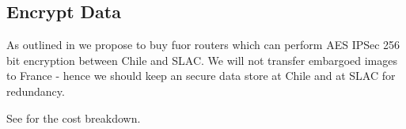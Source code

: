 \subsection{Encrypt Data} \label{sec:1encrypt}

As outlined in   we propose to buy fuor routers which can perform AES IPSec 256 bit encryption between Chile and SLAC.
We will not transfer embargoed images to France - hence we should keep an secure data store at Chile and at SLAC for redundancy.

See  for the cost breakdown.



